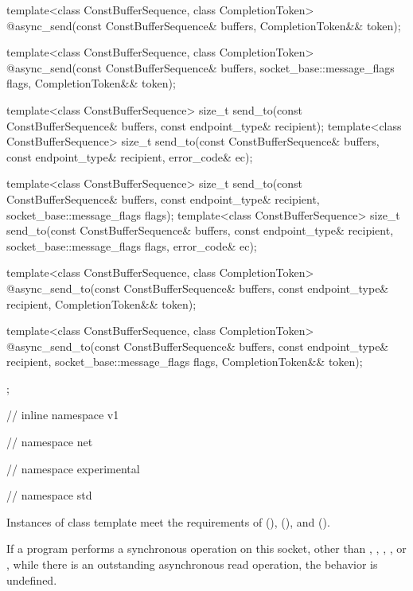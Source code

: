 \begin{codeblock}
{{{{{    template<class ConstBufferSequence, class CompletionToken>
      @\DEDUCED@ async_send(const ConstBufferSequence& buffers,
                         CompletionToken&& token);

    template<class ConstBufferSequence, class CompletionToken>
      @\DEDUCED@ async_send(const ConstBufferSequence& buffers,
                         socket_base::message_flags flags,
                         CompletionToken&& token);

    template<class ConstBufferSequence>
      size_t send_to(const ConstBufferSequence& buffers,
                     const endpoint_type& recipient);
    template<class ConstBufferSequence>
      size_t send_to(const ConstBufferSequence& buffers,
                     const endpoint_type& recipient, error_code& ec);

    template<class ConstBufferSequence>
      size_t send_to(const ConstBufferSequence& buffers,
                     const endpoint_type& recipient,
                     socket_base::message_flags flags);
    template<class ConstBufferSequence>
      size_t send_to(const ConstBufferSequence& buffers,
                     const endpoint_type& recipient,
                     socket_base::message_flags flags, error_code& ec);

    template<class ConstBufferSequence, class CompletionToken>
      @\DEDUCED@ async_send_to(const ConstBufferSequence& buffers,
                            const endpoint_type& recipient,
                            CompletionToken&& token);

    template<class ConstBufferSequence, class CompletionToken>
      @\DEDUCED@ async_send_to(const ConstBufferSequence& buffers,
                            const endpoint_type& recipient,
                            socket_base::message_flags flags,
                            CompletionToken&& token);
  };

} // inline namespace v1
} // namespace net
} // namespace experimental
} // namespace std
\end{codeblock}

\pnum
Instances of class template  meet the requirements of  (),  (), and  ().

\pnum
If a program performs a synchronous operation on this socket, other than , , , , or , while there is an outstanding asynchronous read operation, the behavior is undefined.

